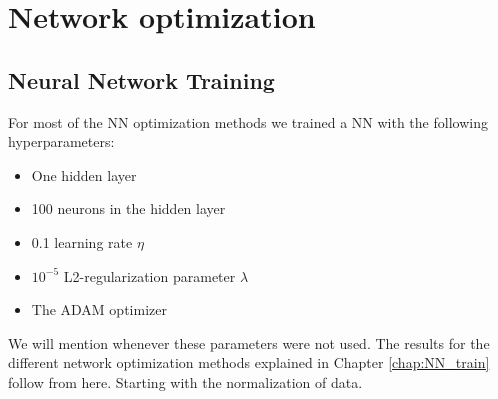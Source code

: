 \documentclass[12pt, a4paper]{book}
\begin{document}
\chapter{Network optimization}\label{chap:network_opt}
\section{Neural Network Training}
For most of the NN optimization methods we trained a NN with the following hyperparameters:
\begin{itemize}
   \item One hidden layer
   \item 100 neurons in the hidden layer
   \item 0.1 learning rate $\eta$
   \item $10^{-5}$ L2-regularization parameter $\lambda$
   \item The ADAM optimizer
\end{itemize}
We will mention whenever these parameters were not used. The results for the different network optimization methods explained in Chapter \ref{chap:NN_train} follow from here. Starting with the normalization of data.\\

\clearpage
\end{document}
